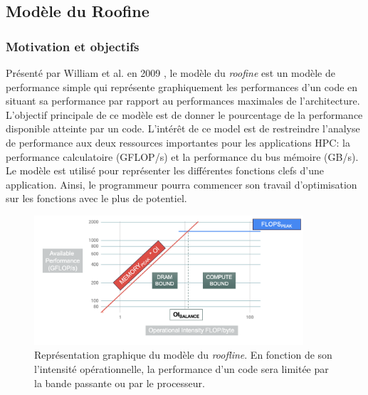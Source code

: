 \subsection{Modèle du Roofine} \label{sec:roofline}

\subsubsection{Motivation et objectifs}

Présenté par William et al. en 2009 \cite{Williams2008}, le modèle du \textit{roofine} est un modèle de performance simple qui représente graphiquement les performances d’un code en situant sa performance par rapport au performances maximales de l’architecture. L’objectif principale de ce modèle est de donner le pourcentage de la performance disponible atteinte par un code. L’intérêt de ce model est de restreindre l’analyse de performance aux deux ressources importantes pour les applications HPC: la performance calculatoire (GFLOP/s) et la performance du bus mémoire (GB/s).
Le modèle est utilisé pour représenter les différentes fonctions clefs d’une application. Ainsi, le programmeur pourra commencer son travail d’optimisation sur les fonctions avec le plus de potentiel.

\begin{figure}
    \center
    \includegraphics[width=10cm]{images/roofline.png}
    \caption{\label{fig:roofline} Représentation graphique du modèle du \textit{roofline}. En fonction de son l'intensité opérationnelle, la performance d'un code sera limitée par la bande passante ou par le processeur.}
\end{figure}


